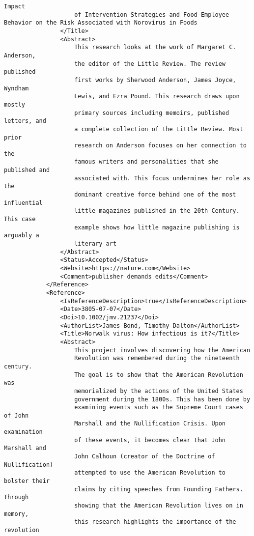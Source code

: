 \begin{lstlisting}[language=RAKIP, caption={Example of DoseResponseModel}]
                    Impact
                    of Intervention Strategies and Food Employee Behavior on the Risk Associated with Norovirus in Foods
                </Title>
                <Abstract>
                    This research looks at the work of Margaret C. Anderson,
                    the editor of the Little Review. The review published
                    first works by Sherwood Anderson, James Joyce, Wyndham
                    Lewis, and Ezra Pound. This research draws upon mostly
                    primary sources including memoirs, published letters, and
                    a complete collection of the Little Review. Most prior
                    research on Anderson focuses on her connection to the
                    famous writers and personalities that she published and
                    associated with. This focus undermines her role as the
                    dominant creative force behind one of the most influential
                    little magazines published in the 20th Century. This case
                    example shows how little magazine publishing is arguably a
                    literary art
                </Abstract>
                <Status>Accepted</Status>
                <Website>https://nature.com</Website>
                <Comment>publisher demands edits</Comment>
            </Reference>
            <Reference>
                <IsReferenceDescription>true</IsReferenceDescription>
                <Date>3805-07-07</Date>
                <Doi>10.1002/jmv.21237</Doi>
                <AuthorList>James Bond, Timothy Dalton</AuthorList>
                <Title>Norwalk virus: How infectious is it?</Title>
                <Abstract>
                    This project involves discovering how the American
                    Revolution was remembered during the nineteenth century.
                    The goal is to show that the American Revolution was
                    memorialized by the actions of the United States
                    government during the 1800s. This has been done by
                    examining events such as the Supreme Court cases of John
                    Marshall and the Nullification Crisis. Upon examination
                    of these events, it becomes clear that John Marshall and
                    John Calhoun (creator of the Doctrine of Nullification)
                    attempted to use the American Revolution to bolster their
                    claims by citing speeches from Founding Fathers. Through
                    showing that the American Revolution lives on in memory,
                    this research highlights the importance of the revolution

\end{lstlisting}
